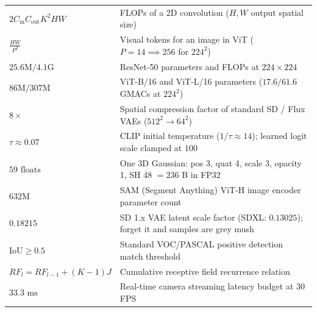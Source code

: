 \begin{mem}
\begin{tabularx}{\linewidth}{@{}lL@{}}
$2 C_{\text{in}} C_{\text{out}} K^2 H W$ & FLOPs of a 2D convolution ($H, W$ output spatial size)\\
$\frac{H W}{P^2}$ & Visual tokens for an image in ViT ($P=14 \implies 256$ for $224^2$)\\
$25.6\text{M} / 4.1\text{G}$ & ResNet-50 parameters and FLOPs at $224\times 224$\\
$86\text{M} / 307\text{M}$ & ViT-B/16 and ViT-L/16 parameters ($17.6 / 61.6$ GMACs at $224^2$)\\
$8\times$ & Spatial compression factor of standard SD / Flux VAEs ($512^2 \to 64^2$)\\
$\tau \approx 0.07$ & CLIP initial temperature ($1/\tau \approx 14$); learned logit scale clamped at $100$\\
$59\text{ floats}$ & One 3D Gaussian: pos 3, quat 4, scale 3, opacity 1, SH 48 $= 236$ B in FP32\\
$632\text{M}$ & SAM (Segment Anything) ViT-H image encoder parameter count\\
$0.18215$ & SD 1.x VAE latent scale factor (SDXL: $0.13025$); forget it and samples are grey mush\\
$\text{IoU} \ge 0.5$ & Standard VOC/PASCAL positive detection match threshold\\
$RF_l = RF_{l-1} + (K-1)J$ & Cumulative receptive field recurrence relation\\
$33.3\text{ ms}$ & Real-time camera streaming latency budget at 30 FPS\\
\end{tabularx}
\end{mem}

{\small\tableofcontents}
